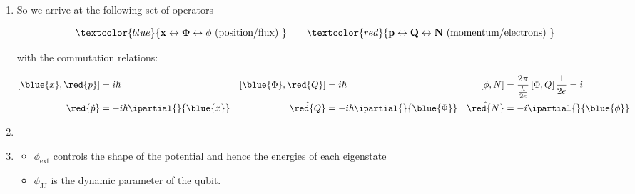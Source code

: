 \begin{enumerate}
\item So we arrive at the following set of operators
  
  \begin{equation}
    { \textcolor{blue}{\mathbf{x\leftrightarrow \Phi \leftrightarrow \phi} \text{ (position/flux) }}\qquad \textcolor{red}{\mathbf{p\leftrightarrow Q \leftrightarrow N \text{ (momentum/electrons) }}}}
  \end{equation}
  
  \noindent with the commutation relations:
  
  \begin{align}
    \left[\blue{x},\red{p}\right] & =i\hbar & \left[\blue{\Phi},\red{Q}\right] & = i\hbar & \left[\phi,N\right] & = \frac{2\pi}{\frac{h}{2e}}\left[\Phi,Q\right]\frac{1}{2e} = i\\
    \red{\hat{p}} & = -i\hbar\ipartial{}{\blue{x}} & \hat{\red{Q}} & =-i\hbar\ipartial{}{\blue{\Phi}} & \hat{\red{N}} & =-i\ipartial{}{\blue{\phi}}
  \end{align}
  
\item\
  
  
\item{}
  \begin{itemize}
  \item $ \phi_{\text{ext}}  $ controls the shape  of the potential and hence  the energies of
    each eigenstate
  \item $ \phi_{\text{JJ}} $ is the dynamic parameter of the qubit.
  \end{itemize}
\end{enumerate}
 
